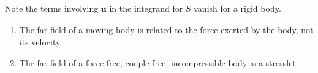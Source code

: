 \documentclass{jknotes}
\newcommand{\dunder}[1]{\underline{\underline{#1}}}
\renewcommand{\u}{\bm{u}}
\begin{document}
Note the terms involving $\u$ in the integrand for $\dunder{S}$ vanish for a
rigid body.

\begin{enumerate}
	\item The far-field of a moving body is related to the force exerted by
		the body, not its velocity.
	\item The far-field of a force-free, couple-free, incompressible body is a
		stresslet.
\end{enumerate}
\end{document}
